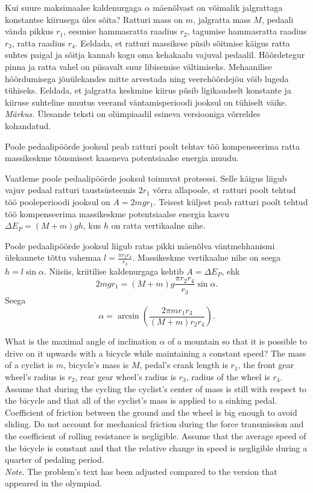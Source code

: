 
Kui suure maksimaalse kaldenurgaga $\alpha$ mäenõlvast on võimalik jalgrattaga konstantse kiirusega üles sõita? Ratturi mass on $m$, jalgratta mass $M$, pedaali vända pikkus $r_1$, eesmise hammasratta raadius $r_2$, tagumise hammasratta raadius $r_3$, ratta raadius $r_4$. Eeldada, et ratturi massikese püsib sõitmise käigus ratta suhtes paigal ja sõitja kannab kogu oma kehakaalu vajuval pedaalil. Hõõrdetegur pinna ja ratta vahel on piisavalt suur libisemise vältimiseks. Mehaanilise hõõrdumisega jõuülekandes mitte arvestada ning veerehõõrdejõu võib lugeda tühiseks. Eeldada, et jalgratta keskmine kiirus püsib ligikaudselt konstante ja kiiruse suhteline muutus veerand väntamisperioodi jooksul on tühiselt väike.\\
\emph{Märkus.} Ülesande teksti on olümpiaadil esineva versiooniga võrreldes kohandatud.

\hint
Poole pedaalipöörde jooksul peab ratturi poolt tehtav töö kompenseerima ratta massikeskme tõusmisest kaasneva potentsiaalse energia muudu.

\solu
Vaatleme poole pedaalipöörde jooksul toimuvat protsessi. Selle käigus liigub vajuv pedaal ratturi taustsüsteemis $2r_1$ võrra allapoole, st ratturi poolt tehtud töö pooleperioodi jooksul on $A = 2mgr_1$. Teisest küljest peab ratturi poolt tehtud töö kompenseerima massikeskme potentsiaalse energia kasvu $\Delta E_P = (M + m)gh$, kus $h$ on ratta vertikaalne nihe. 

Poole pedaalipöörde jooksul liigub ratas pikki mäenõlva väntmehhanismi ülekannete tõttu vahemaa $l=\frac{\pi r_2 r_4}{r_3}$. Massikeskme vertikaalne nihe on seega $h = l\sin\alpha$. Niisiis, kriitilise kaldenurgaga kehtib $A = \Delta E_P$, ehk
\[
2mgr_1 = (M + m)g\frac{\pi r_2r_4}{r_3}\sin\alpha.
\]
Seega
\[
\alpha = \arcsin\left(\frac{2\pi mr_1r_3}{(M + m)r_2r_4}\right).
\]

What is the maximal angle of inclination $\alpha$ of a mountain so that it is possible to drive on it upwards with a bicycle while maintaining a constant speed? The mass of a cyclist is $m$, bicycle’s mass is $M$, pedal’s crank length is $r_1$, the front gear wheel’s radius is $r_2$, rear gear wheel’s radius is $r_3$, radius of the wheel is $r_4$. Assume that during the cycling the cyclist’s center of mass is still with respect to the bicycle and that all of the cyclist’s mass is applied to a sinking pedal. Coefficient of friction between the ground and the wheel is big enough to avoid sliding. Do not account for mechanical friction during the force transmission and the coefficient of rolling resistance is negligible. Assume that the average speed of the bicycle is constant and that the relative change in speed is negligible during a quarter of pedaling period.\\
\emph{Note}. The problem’s text has been adjusted compared to the version that appeared in the olympiad.

